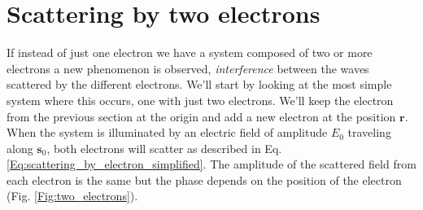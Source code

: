 \section{Scattering by two electrons}\label{scat_two_electrons}

If instead of just one electron we have a system composed of two or more
electrons a new phenomenon is observed, {\em interference} between the waves
scattered by the different electrons. We'll start by looking at the most simple
system where this occurs, one with just two electrons. We'll keep the electron
from the previous section at the origin and add a new electron at the position
$\mathbf r$. When the system is illuminated by an electric field of amplitude $E_0$
traveling along $\mathbf s_0$, both electrons will scatter as described in
Eq. \ref{Eq:scattering_by_electron_simplified}. The amplitude of the scattered
field from each electron is the same but the phase depends on the position of
the electron (Fig. \ref{Fig:two_electrons}). 

